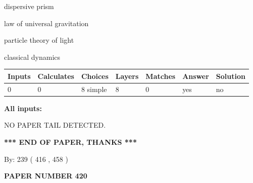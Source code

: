 \documentclass[12pt]{article}
\begin{document}
 
dispersive prism
 
 
law of universal gravitation
 
 
particle theory of light
 
 
classical dynamics
 
 
\noindent{}
 
 
   
   
   
   
\noindent\begin{tabular}{|l|l|l|l|l|l|l|}
 \hline
Inputs & Calculates & Choices & Layers & Matches & Answer & Solution \\ \hline
 0  & 
 0  & 
 8
  simple  
  & 
 8  & 
 0  & 
  yes & 
  no 
  \\ \hline
 \end{tabular}
   
   
   
   
\noindent{}
   
   
   
   
\noindent\vspace{0.1in}\hspace{-0.08in} {\textbf{\Large{All inputs: }}}
   
   
   
   
\vspace{2.0in} NO PAPER TAIL DETECTED.
   
   
   
   
\vspace{1.0in} 
{\textbf{\large{ *** END OF PAPER, THANKS *** }}} 
   
   
\hspace{1.0in} By: 
 239 ( 416 ,  458 )
   
   
   
   
\newpage 
\setcounter{page}{ 
   420001 } 
   
   
   
   
 {\textbf{ \Large{ PAPER NUMBER  420  }}}
   
   
\vspace{0.2in}
   
   
   
\end{document}

